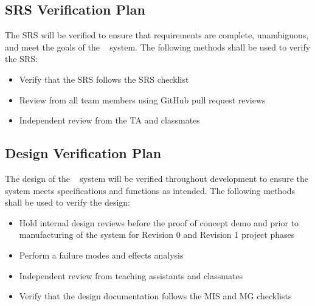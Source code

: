 \documentclass[12pt, titlepage]{article}
\begin{document}
\subsection{SRS Verification Plan}



The SRS will be verified to ensure that requirements are complete, unambiguous, and meet the goals of the \progname~ system. The following methods shall be used to verify the SRS: 

\begin{itemize}
  \item Verify that the SRS follows the SRS checklist \cite{Checklist-SRS}
  \item Review from all team members using GitHub pull request reviews
  \item Independent review from the TA and classmates
\end{itemize}

\subsection{Design Verification Plan}



The design of the \progname~ system will be verified throughout development to ensure the system meets specifications and functions as intended. The following methods shall be used to verify the design:

\begin{itemize}
  \item Hold internal design reviews before the proof of concept demo and prior to manufacturing of the system for Revision 0 and Revision 1 project phases
  \item Perform a failure modes and effects analysis
  \item Independent review from teaching assistants and classmates
  \item Verify that the design documentation follows the MIS \cite{Checklist-MIS} and MG \cite{checklist-MG} checklists
\end{itemize}
\end{document}
